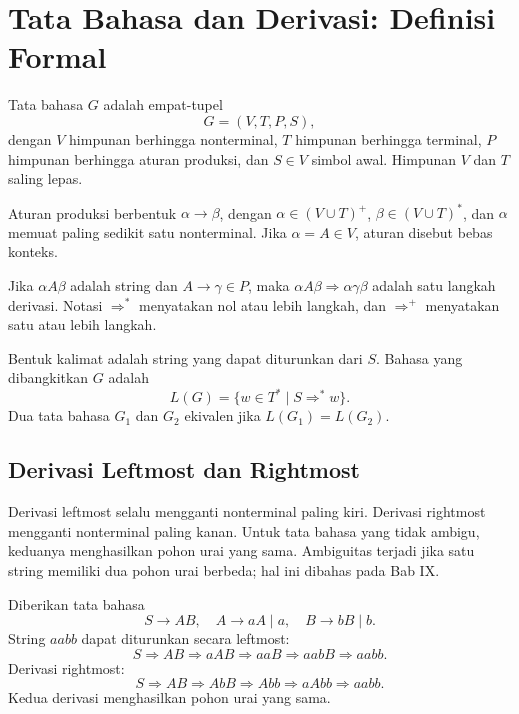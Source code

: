 \section{Tata Bahasa dan Derivasi: Definisi Formal}
\label{sec:ch04-grammar}

\begin{definisi}
Tata bahasa \(G\) adalah empat-tupel
\[
G = (V, T, P, S),
\]
dengan \(V\) himpunan berhingga nonterminal, \(T\) himpunan berhingga
terminal, \(P\) himpunan berhingga aturan produksi, dan \(S \in V\)
simbol awal. Himpunan \(V\) dan \(T\) saling lepas.
\end{definisi}

Aturan produksi berbentuk \(\alpha \to \beta\), dengan
\(\alpha \in (V \cup T)^{+}\), \(\beta \in (V \cup T)^{*}\), dan
\(\alpha\) memuat paling sedikit satu nonterminal. Jika
\(\alpha = A \in V\), aturan disebut bebas konteks.

\begin{definisi}[Derivasi]
Jika \(\alpha A \beta\) adalah string dan \(A \to \gamma \in P\),
maka \(\alpha A \beta \Rightarrow \alpha \gamma \beta\) adalah satu
langkah derivasi. Notasi \(\Rightarrow^{*}\) menyatakan nol atau lebih
langkah, dan \(\Rightarrow^{+}\) menyatakan satu atau lebih langkah.
\end{definisi}

Bentuk kalimat adalah string yang dapat diturunkan dari \(S\).
Bahasa yang dibangkitkan \(G\) adalah
\[
L(G) = \{w \in T^{*} \mid S \Rightarrow^{*} w\}.
\]
Dua tata bahasa \(G_1\) dan \(G_2\) ekivalen jika
\(L(G_1) = L(G_2)\).

\subsection{Derivasi Leftmost dan Rightmost}

Derivasi leftmost selalu mengganti nonterminal paling kiri. Derivasi
rightmost mengganti nonterminal paling kanan. Untuk tata bahasa yang
tidak ambigu, keduanya menghasilkan pohon urai yang sama. Ambiguitas
terjadi jika satu string memiliki dua pohon urai berbeda; hal ini
dibahas pada Bab IX.

\begin{contoh}
Diberikan tata bahasa
\[
S \to AB, \quad A \to aA \mid a, \quad B \to bB \mid b.
\]
String \(aabb\) dapat diturunkan secara leftmost:
\[
S \Rightarrow AB \Rightarrow aAB \Rightarrow aaB
\Rightarrow aabB \Rightarrow aabb.
\]
Derivasi rightmost:
\[
S \Rightarrow AB \Rightarrow AbB \Rightarrow Abb
\Rightarrow aAbb \Rightarrow aabb.
\]
Kedua derivasi menghasilkan pohon urai yang sama.
\end{contoh}

